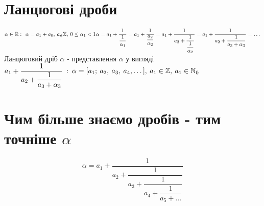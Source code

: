 \documentclass[a4paper,12pt, centered]{bookest}
\begin{document}
\begin{appendices}
\section{Ланцюгові дроби}
$\alpha\in\mathbb{R}:\>\>\alpha=a_1+a_0,\>a_\in\mathbb{Z},\>0\leq\alpha_1<1\\
\alpha=a_1+\dfrac{1}{\dfrac{1}{\alpha_1}}=a_1+\dfrac{1}{\dfrac{a_2}{\alpha_2}}=a_1+\dfrac{1}{a_2+\dfrac{1}{\dfrac{1}{\alpha_2}}}=a_1+\dfrac{1}{a_2+\dfrac{1}{a_3+\alpha_3}}=\dots\\$
Ланцюговий дріб $\alpha$ - представлення $\alpha$ у вигляді $a_1+\dfrac{1}{a_2+\dfrac{1}{a_3+\alpha_3}}\>:\>\alpha=[a_1;\>a_2,\>a_3,\>a_4,\dots],\\\>a_1\in\mathbb{Z},\>a_1\in\mathbb{N}_0$
\section{Чим більше знаємо дробів - тим точніше $\alpha$}
$$\alpha=a_1+\dfrac{1}{a_2+\dfrac{1}{a_3+\dfrac{1}{a_4+\dfrac{1}{a_5+\dots}}}}$$

\end{appendices}
\end{document}
